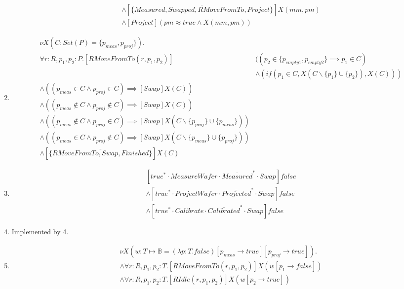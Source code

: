 \begin{enumerate}
\begin{align*}
    	&\wedge [\overline{\{Measured, Swapped, RMoveFromTo, Project\}}]X(mm, pm)\\
    	&\wedge [Project](pm \approx true \wedge X(mm, pm))
    \end{align*}
        \item \begin{align*}
            &\nu X(C : Set(P) = \{p_\mathit{meas},p_\mathit{proj}\}).\\
            & \forall r:R, p_1, p_2 : P . [RMoveFromTo(r, p_1, p_2)]&((p_2 \in \{p_\mathit{empty1}, p_\mathit{empty2}\} \implies p_1 \in C)\\
            &&\wedge (if(p_1 \in C, X(C\backslash\{p_1\}\cup\{p_2\}), X(C))) \\
            &\wedge ((p_\mathit{meas} \in C \wedge p_\mathit{proj} \in C) \implies [Swap]X(C))\\
            &\wedge ((p_\mathit{meas} \notin C \wedge p_\mathit{proj} \notin C) \implies [Swap]X(C))\\
            &\wedge ((p_\mathit{meas} \notin C \wedge p_\mathit{proj} \in C) \implies [Swap]X(C\backslash\{p_\mathit{proj}\} \cup \{p_\mathit{meas}\}))\\
            &\wedge ((p_\mathit{meas} \in C \wedge p_\mathit{proj} \notin C) \implies [Swap]X(C\backslash\{p_\mathit{meas}\} \cup \{p_\mathit{proj}\}))\\
            &\wedge [\overline{\{RMoveFromTo, Swap, Finished\}}]X(C)
        \end{align*}
    \item \begin{align*}
	    &[true^{*}\cdot MeasureWafer\cdot \overline{Measured}^{*}\cdot Swap]false\\
		&\wedge [true^{*}\cdot ProjectWafer\cdot \overline{Projected}^{*}\cdot Swap]false\\
	    &\wedge [true^{*}\cdot Calibrate\cdot \overline{Calibrated}^{*}\cdot Swap]false
    \end{align*}
    \item Implemented by 4.
    \item \begin{align*}
            &\nu X(w:T\mapsto \mathbb{B} = (\lambda p:T.false)[p_\mathit{meas} \rightarrow true][p_\mathit{proj} \rightarrow true]). \\
            &\wedge \forall r:R, p_1,p_2 :T.[RMoveFromTo(r, p_1,p_2)]X(w[p_1\rightarrow false])\\
            &\wedge \forall r:R, p_1,p_2 :T.[RIdle(r, p_1,p_2)]X(w[p_2\rightarrow true])\\

\end{align*}
\end{enumerate}
